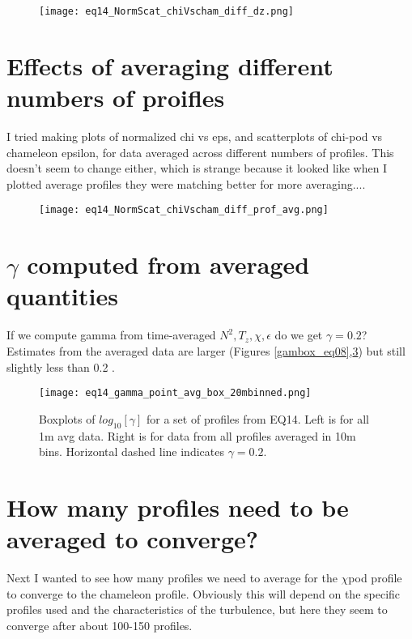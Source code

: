 \documentclass[11pt]{article}
\begin{document}
\begin{figure}[htbp]
\texttt{[image: eq14\_NormScat\_chiVscham\_diff\_dz.png]}
\caption{}
\label{}
\end{figure}




\clearpage
\section{Effects of averaging different numbers of proifles}

I tried making plots of normalized chi vs eps, and scatterplots of chi-pod vs chameleon epsilon, for data averaged across different numbers of profiles. This doesn't seem to change either, which is strange because it looked like when I plotted average profiles they were matching better for more averaging....

\begin{figure}[htbp]
\texttt{[image: eq14\_NormScat\_chiVscham\_diff\_prof\_avg.png]}
\caption{}
\label{}
\end{figure}







\clearpage
\section{$\gamma$ computed from averaged quantities}

If we compute gamma from time-averaged $N^2,T_z,\chi,\epsilon$ do we get $\gamma=0.2$? Estimates from the averaged data are larger (Figures \ref{gambox_eq08},\ref{gambox_eq14}) but still slightly less than 0.2 .

\begin{figure}[htbp]
\texttt{[image: eq14\_gamma\_point\_avg\_box\_20mbinned.png]}
\caption{Boxplots of $log_{10}[\gamma]$ for a set of profiles from EQ14. Left is for all 1m avg data. Right is for data from all profiles averaged in 10m bins. Horizontal dashed line indicates $\gamma=0.2$.}
\label{gambox_eq14}
\end{figure}


\clearpage
\section{How many profiles need to be averaged to converge?}

Next I wanted to see how many profiles we need to average for the $\chi$pod profile to converge to the chameleon profile. Obviously this will depend on the specific profiles used and the characteristics of the turbulence, but here they seem to converge after about 100-150 profiles. 
\end{document}
